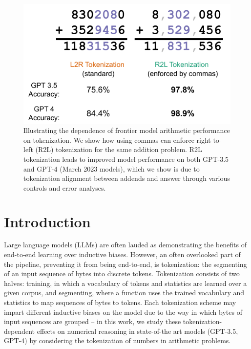 \documentclass{article}
\theoremstyle{plain}
\theoremstyle{definition}
\theoremstyle{remark}
\begin{document}
\begin{figure}[h]
    \centering
    \includegraphics[width=\columnwidth]{figures/Figure1.pdf}
    \vspace{-2em}
    \caption{Illustrating the dependence of frontier model arithmetic performance on tokenization. We show how using commas can enforce right-to-left (R2L) tokenization for the same addition problem. R2L tokenization leads to improved model performance on both GPT-3.5 and GPT-4 (March 2023 models), which we show is due to tokenization alignment between addends and answer through various controls and error analyses.}
    \label{fig:main_result}
    \vspace{-1.5em}
\end{figure}

\section{Introduction}

Large language models (LLMs) are often lauded as demonstrating the benefits of end-to-end learning over inductive biases. However, an often overlooked part of the pipeline, preventing it from being end-to-end, is tokenization: the segmenting of an input sequence of bytes into discrete tokens. Tokenization consists of two halves: training, in which a vocabulary of tokens and statistics are learned over a given corpus, and segmenting, where a function uses the trained vocabulary and statistics to map sequences of bytes to tokens. Each tokenization scheme may impart different inductive biases on the model due to the way in which bytes of input sequences are grouped -- in this work, we study these tokenization-dependent effects on numerical reasoning in state-of-the art models (GPT-3.5, GPT-4) by considering the tokenization of numbers in arithmetic problems.
\end{document}
